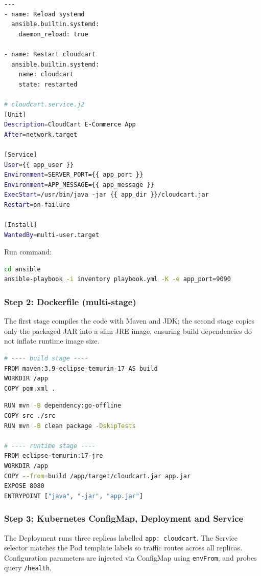 \documentclass[12pt,a4paper]{article}
\begin{document}
\begin{lstlisting}[language=bash]
---
- name: Reload systemd
  ansible.builtin.systemd:
    daemon_reload: true

- name: Restart cloudcart
  ansible.builtin.systemd:
    name: cloudcart
    state: restarted

# cloudcart.service.j2
[Unit]
Description=CloudCart E-Commerce App
After=network.target

[Service]
User={{ app_user }}
Environment=SERVER_PORT={{ app_port }}
Environment=APP_MESSAGE={{ app_message }}
ExecStart=/usr/bin/java -jar {{ app_dir }}/cloudcart.jar
Restart=on-failure

[Install]
WantedBy=multi-user.target
\end{lstlisting}

Run command:
\begin{lstlisting}[language=bash]
cd ansible
ansible-playbook -i inventory playbook.yml -K -e app_port=9090
\end{lstlisting}

\subsubsection*{Step 2: Dockerfile (multi-stage)}
The first stage compiles the code with Maven and JDK; the second stage copies only the packaged JAR into a slim JRE image, ensuring build dependencies do not inflate runtime image size.

\begin{lstlisting}[language=bash]
# ---- build stage ----
FROM maven:3.9-eclipse-temurin-17 AS build
WORKDIR /app
COPY pom.xml .
\end{lstlisting}

\newpage

\begin{lstlisting}[language=bash,firstnumber=5]
RUN mvn -B dependency:go-offline
COPY src ./src
RUN mvn -B clean package -DskipTests

# ---- runtime stage ----
FROM eclipse-temurin:17-jre
WORKDIR /app
COPY --from=build /app/target/cloudcart.jar app.jar
EXPOSE 8080
ENTRYPOINT ["java", "-jar", "app.jar"]
\end{lstlisting}

\subsubsection*{Step 3: Kubernetes ConfigMap, Deployment and Service}
The Deployment runs three replicas labelled \texttt{app: cloudcart}. The Service selector matches the Pod template labels so traffic routes across all replicas. Configuration parameters are injected via ConfigMap using \texttt{envFrom}, and probes query \texttt{/health}.
\end{document}
